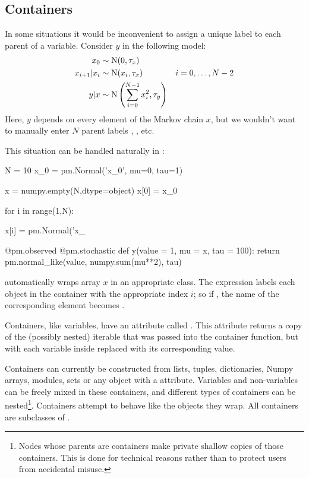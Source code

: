 \documentclass[]{jss}
\begin{document}
\subsection{Containers} \label{container}

In some situations it would be inconvenient to assign a unique label to each parent of a variable. Consider $y$ in the following model:
\begin{align*}
    x_0 &\sim \textup N (0,\tau_x)\\
    x_{i+1}|x_i &\sim \textup{N}(x_i, \tau_x)
    &i=0,\ldots, N-2\\
    y|x &\sim \textup N \left(\sum_{i=0}^{N-1}x_i^2,\tau_y\right)
\end{align*}
Here, $y$ depends on every element of the Markov chain $x$, but we wouldn't want to manually enter $N$ parent labels , , etc.

This situation can be handled naturally in :
\begin{CodeInput}
N = 10
x_0 = pm.Normal('x_0', mu=0, tau=1)

x = numpy.empty(N,dtype=object)
x[0] = x_0

for i in range(1,N):

x[i] = pm.Normal('x_%

@pm.observed
@pm.stochastic
def y(value = 1, mu = x, tau = 100):
return pm.normal_like(value, numpy.sum(mu**2), tau)
\end{CodeInput}
 automatically wraps array $x$ in an appropriate  class. The  expression  labels each  object in the container with the appropriate index $i$; so if , the name of the corresponding element becomes .

Containers, like variables, have an attribute called . This attribute returns a copy of the (possibly nested) iterable that was passed into the container function, but with each variable inside replaced with its corresponding value.

Containers can currently be constructed from lists, tuples, dictionaries, Numpy arrays, modules, sets or any object with a  attribute. Variables and non-variables can be freely mixed in these containers, and different types of containers can be nested\footnote{Nodes whose parents are containers make private shallow copies of those containers. This is done for technical reasons rather than to protect users from accidental misuse.}. Containers attempt to behave like the objects they wrap. All containers are subclasses of .
\end{document}
